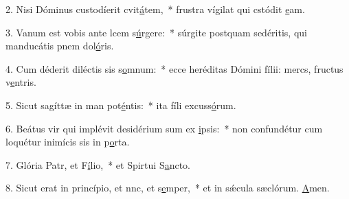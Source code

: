 2. Nisi Dóminus custodíerit cvit\uline{á}tem,~* frustra vígilat qui cstódit \uline{e}am.\par 
3. Vanum est vobis ante lcem s\uline{ú}rgere:~* súrgite postquam sedéritis, qui manducátis pnem dol\uline{ó}ris.\par 
4. Cum déderit diléctis sis s\uline{o}mnum:~* ecce heréditas Dómini fílii: mercs, fructus v\uline{e}ntris.\par 
5. Sicut sagíttæ in man pot\uline{é}ntis:~* ita fíli excuss\uline{ó}rum.\par 
6. Beátus vir qui implévit desidérium sum ex \uline{i}psis:~* non confundétur cum loquétur inimícis sis in p\uline{o}rta.\par 
7. Glória Patr, et F\uline{í}lio,~* et Spirtui S\uline{a}ncto.\par 
8. Sicut erat in princípio, et nnc, et s\uline{e}mper,~* et in sǽcula sæclórum. \uline{A}men.\par 
